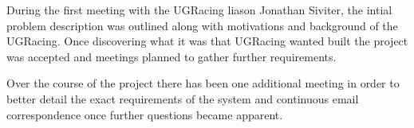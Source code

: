 During the first meeting with the UGRacing liason Jonathan Siviter, the intial problem description was outlined along with motivations and background of the UGRacing. Once discovering what it was that UGRacing wanted built the project was accepted and meetings planned to gather further requirements. 

Over the course of the project there has been one additional meeting in order to better detail the exact requirements of the system and continuous email correspondence once further questions became apparent.
